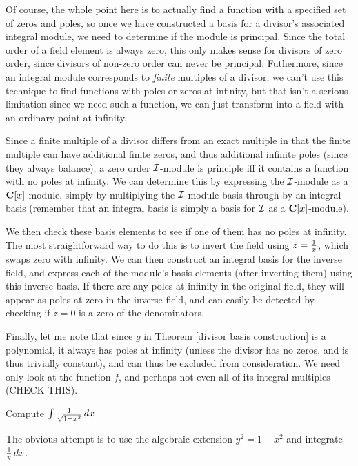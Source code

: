 \endtheorem

Of course, the whole point here is to actually find a function with a
specified set of zeros and poles, so once we have constructed a basis
for a divisor's associated integral module, we need to determine if
the module is principal.  Since the total order of a field element is
always zero, this only makes sense for divisors of zero order, since
divisors of non-zero order can never be principal.  Futhermore, since
an integral module corresponds to {\it finite} multiples of a divisor,
we can't use this technique to find functions with poles or zeros at
infinity, but that isn't a serious limitation since we need such a
function, we can just transform into a field with an ordinary point at
infinity.

Since a finite multiple of a divisor differs from an exact multiple in
that the finite multiple can have additional finite zeros, and thus
additional infinite poles (since they always balance), a zero order
${\cal I}$-module is principle iff it contains a function with no
poles at infinity.  We can determine this by expressing the ${\cal
I}$-module as a ${\bf C}[x]$-module, simply by multiplying the ${\cal
I}$-module basis through by an integral basis (remember that an
integral basis is simply a basis for ${\cal I}$ as a ${\bf
C}[x]$-module).

We then check these basis elements to see if one of them has no poles
at infinity.  The most straightforward way to do this is to invert the
field using $z={1\over x}$, which swaps zero with infinity.  We can
then construct an integral basis for the inverse field, and express
each of the module's basis elements (after inverting them) using this
inverse basis.  If there are any poles at infinity in the original
field, they will appear as poles at zero in the inverse field, and can
easily be detected by checking if $z=0$ is a zero of the denominators.

Finally, let me note that since $g$ in Theorem \ref{divisor basis
construction} is a polynomial, it always has poles at infinity (unless
the divisor has no zeros, and is thus trivially constant), and can
thus be excluded from consideration.  We need only look at the
function $f$, and perhaps not even all of its integral multiples
(CHECK THIS).

\example Compute $\int {1\over{\sqrt{1-x^2}}} \,dx$

The obvious attempt is to use the algebraic extension $y^2=1-x^2$ and
integrate ${1\over y}\,dx$.

